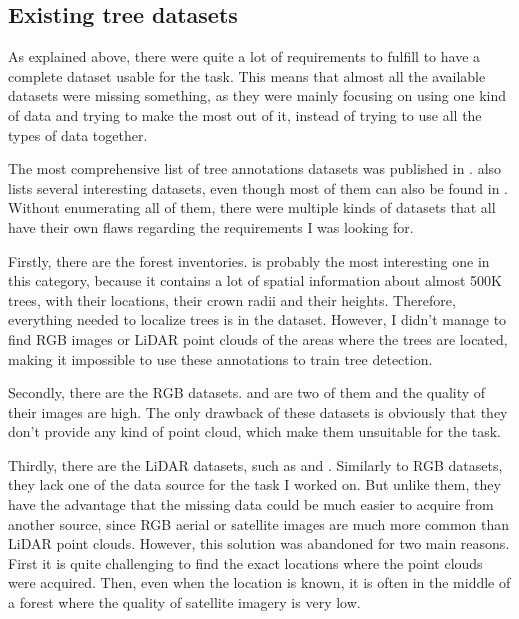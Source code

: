 \documentclass[
]{report}
\begin{document}
\subsection{Existing tree datasets}\label{existing-tree-datasets}

As explained above, there were quite a lot of requirements to fulfill to
have a complete dataset usable for the task. This means that almost all
the available datasets were missing something, as they were mainly
focusing on using one kind of data and trying to make the most out of
it, instead of trying to use all the types of data together.

The most comprehensive list of tree annotations datasets was published
in \autocite{OpenForest}. \autocite{FoMo-Bench} also lists several
interesting datasets, even though most of them can also be found in
\autocite{OpenForest}. Without enumerating all of them, there were
multiple kinds of datasets that all have their own flaws regarding the
requirements I was looking for.

Firstly, there are the forest inventories. \autocite{TALLO} is probably
the most interesting one in this category, because it contains a lot of
spatial information about almost 500K trees, with their locations, their
crown radii and their heights. Therefore, everything needed to localize
trees is in the dataset. However, I didn't manage to find RGB images or
LiDAR point clouds of the areas where the trees are located, making it
impossible to use these annotations to train tree detection.

Secondly, there are the RGB datasets. \autocite{ReforesTree} and
\autocite{MillionTrees} are two of them and the quality of their images
are high. The only drawback of these datasets is obviously that they
don't provide any kind of point cloud, which make them unsuitable for
the task.

Thirdly, there are the LiDAR datasets, such as \autocite{WildForest3D}
and \autocite{FOR-instance}. Similarly to RGB datasets, they lack one of
the data source for the task I worked on. But unlike them, they have the
advantage that the missing data could be much easier to acquire from
another source, since RGB aerial or satellite images are much more
common than LiDAR point clouds. However, this solution was abandoned for
two main reasons. First it is quite challenging to find the exact
locations where the point clouds were acquired. Then, even when the
location is known, it is often in the middle of a forest where the
quality of satellite imagery is very low.
\end{document}
